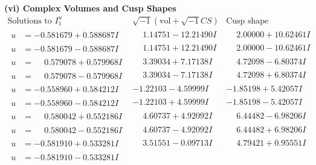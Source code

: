 \documentclass[1p]{elsarticle_modified}
\theoremstyle{definition}
\newcommand{\I}{\sqrt{-1}}
\begin{document}
\newpage\flushleft \textbf{(vi) Complex Volumes and Cusp Shapes}
$$\begin{array}{c|c|c}  
\text{Solutions to }I^u_{1}& \I (\text{vol} + \sqrt{-1}CS) & \text{Cusp shape}\\
 \hline 
\begin{aligned}
u &= -0.581679 + 0.588687 I\end{aligned}
 & \phantom{-}1.14751 - 12.21490 I & \phantom{-}2.00000 + 10.62461 I \\ \hline\begin{aligned}
u &= -0.581679 - 0.588687 I\end{aligned}
 & \phantom{-}1.14751 + 12.21490 I & \phantom{-}2.00000 - 10.62461 I \\ \hline\begin{aligned}
u &= \phantom{-}0.579078 + 0.579968 I\end{aligned}
 & \phantom{-}3.39034 + 7.17138 I & \phantom{-}4.72098 - 6.80374 I \\ \hline\begin{aligned}
u &= \phantom{-}0.579078 - 0.579968 I\end{aligned}
 & \phantom{-}3.39034 - 7.17138 I & \phantom{-}4.72098 + 6.80374 I \\ \hline\begin{aligned}
u &= -0.558960 + 0.584212 I\end{aligned}
 & -1.22103 - 4.59999 I & -1.85198 + 5.42057 I \\ \hline\begin{aligned}
u &= -0.558960 - 0.584212 I\end{aligned}
 & -1.22103 + 4.59999 I & -1.85198 - 5.42057 I \\ \hline\begin{aligned}
u &= \phantom{-}0.580042 + 0.552186 I\end{aligned}
 & \phantom{-}4.60737 + 4.92092 I & \phantom{-}6.44482 - 6.98206 I \\ \hline\begin{aligned}
u &= \phantom{-}0.580042 - 0.552186 I\end{aligned}
 & \phantom{-}4.60737 - 4.92092 I & \phantom{-}6.44482 + 6.98206 I \\ \hline\begin{aligned}
u &= -0.581910 + 0.533281 I\end{aligned}
 & \phantom{-}3.51551 - 0.09713 I & \phantom{-}4.79421 + 0.95551 I \\ \hline\begin{aligned}
u &= -0.581910 - 0.533281 I\end{aligned}

\end{array}$$
\end{document}
